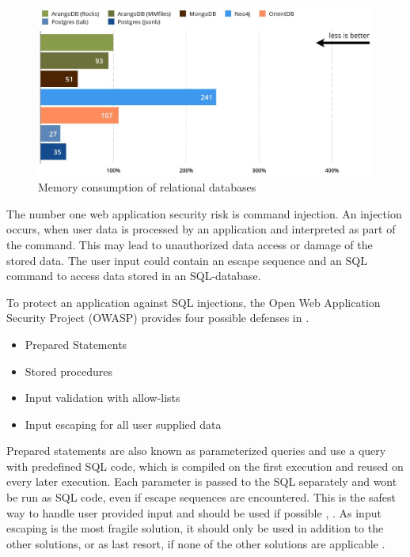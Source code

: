         \begin{figure}[h!]
            \centering
            \includegraphics[width=\textwidth]{latex/figures/mem_db.jpg}
            \caption[Memory consumption of relational databases]{Memory consumption of relational databases \cite{noauthor_benchmark_2018}}
            \label{fig:mem_db}
        \end{figure}
        
        
        The number one web application security risk is command injection.
        An injection occurs, when user data is processed by an application and interpreted as part of the command. This may lead to unauthorized data access or damage of the stored data. 
        The user input could contain an escape sequence and an SQL command to access data stored in an SQL-database.\\
        
        \newpage
        
        To protect an application against SQL injections, the Open Web Application Security Project (OWASP) provides four possible defenses in \cite{owasp_foundation_sql_2021}.
        \begin{itemize}
            \item Prepared Statements
            \item Stored procedures
            \item Input validation with allow-lists 
            \item Input escaping for all user supplied data
        \end{itemize}
        
        Prepared statements are also known as parameterized queries and use a query with predefined SQL code, which is compiled on the first execution and reused on every later execution. Each parameter is passed to the SQL separately and wont be run as SQL code, even if escape sequences are encountered.  This is the safest way to handle user provided input and should be used if possible \cite{owasp_foundation_sql_2021}, \cite{benita_preventing_2021}. As input escaping is the most fragile solution, it should only be used in addition to the other solutions, or as last resort, if none of the other solutions are applicable \cite{owasp_foundation_sql_2021}. 
        
